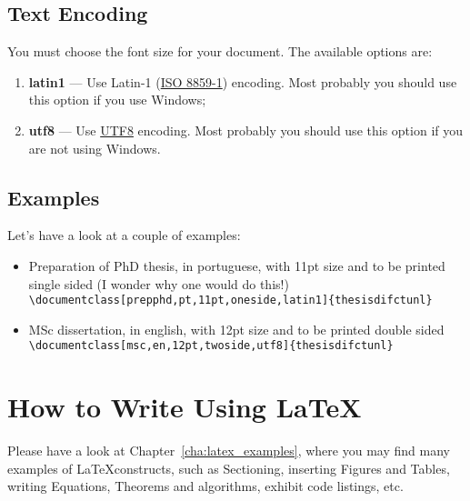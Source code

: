 \subsection{Text Encoding} %
\label{ssec:text_encoding}

You must choose the font size for your document. The available options are:
\begin{enumerate}
	\item \textbf{latin1} --- Use Latin-1 (\href{http://en.wikipedia.org/wiki/ISO/IEC_8859-1}{ISO 8859-1}) encoding.  Most probably you should use this option if you use Windows;
	\item \textbf{utf8} --- Use \href{http://en.wikipedia.org/wiki/UTF-8}{UTF8} encoding.    Most probably you should use this option if you are not using Windows.
\end{enumerate}

\subsection{Examples} %
\label{ssec:examples}

Let's have a look at a couple of examples:

\begin{itemize}
	\item Preparation of PhD thesis, in portuguese, with 11pt size and to be printed single sided (I wonder why one would do this!)\\
	\verb!\documentclass[prepphd,pt,11pt,oneside,latin1]{thesisdifctunl}!
	\item MSc dissertation, in english, with 12pt size and to be printed double sided\\
	\verb!\documentclass[msc,en,12pt,twoside,utf8]{thesisdifctunl}!
\end{itemize}

\section{How to Write Using \LaTeX} %
\label{sec:how_to_write_using_latex}

Please have a look at Chapter~\ref{cha:latex_examples}, where you may find many examples of \LaTeX constructs, such as Sectioning, inserting Figures and Tables, writing Equations, Theorems and algorithms, exhibit code listings, etc.

